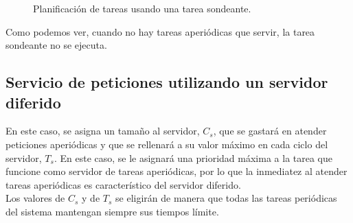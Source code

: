 \begin{ejemplo}
\begin{figure}[H]
        \caption{Planificación de tareas usando una tarea sondeante.}
        \label{fig:tarea_sondeante}
    \end{figure}
    Como podemos ver, cuando no hay tareas aperiódicas que servir, la tarea sondeante no se ejecuta.
\end{ejemplo}

\subsection{Servicio de peticiones utilizando un servidor diferido}
En este caso, se asigna un tamaño al servidor, $C_s$, que se gastará en atender peticiones aperiódicas y que se rellenará a su valor máximo en cada ciclo del servidor, $T_s$. En este caso, se le asignará una prioridad máxima a la tarea que funcione como servidor de tareas aperiódicas, por lo que la inmediatez al atender tareas aperiódicas es característico del servidor diferido.\\

Los valores de $C_s$ y de $T_s$ se eligirán de manera que todas las tareas periódicas del sistema mantengan siempre sus tiempos límite.

